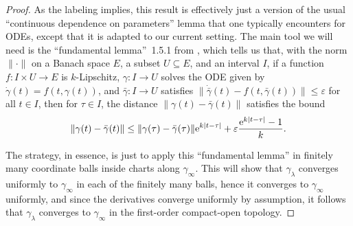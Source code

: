 \documentclass[pdftex]{sigma}
\numberwithin{equation}{section}
\theoremstyle{definition}
\begin{document}
\begin{proof}As the labeling implies, this result is effectively just a version of the usual ``continuous dependence on parameters'' lemma that one typically encounters for ODEs, except that it is adapted to our current setting. The main tool we will need is the ``fundamental lemma''~1.5.1 from \cite[Chapter~2]{HCartan1971}, which tells us that, with the norm $\|\cdot\|$ on a Banach space $E$, a subset $U\subseteq E$, and an interval $I$, if a function $f\colon I\times U\to E$ is $k$-Lipschitz, $\gamma \colon I\to U$ solves the ODE given by $\dot{\gamma}(t)=f(t,\gamma(t))$, and $\bar{\gamma}\colon I\to U$ satisfies $\|\dot{\bar{\gamma}}(t)-f(t,\bar{\gamma}(t))\|\leq\varepsilon$ for all $t\in I$, then for $\tau\in I$, the distance $\|\gamma(t)-\bar{\gamma}(t)\|$ satisfies the bound \[\|\gamma(t)-\bar{\gamma}(t)\|\leq\|\gamma(\tau)-\bar{\gamma}(\tau)\|{\rm e}^{k|t-\tau|}+\varepsilon\frac{{\rm e}^{k|t-\tau|}-1}{k}.\]

The strategy, in essence, is just to apply this ``fundamental lemma'' in finitely many coordinate balls inside charts along $\gamma_\infty$. This will show that $\gamma_\lambda$ converges uniformly to $\gamma_\infty$ in each of the finitely many balls, hence it converges to $\gamma_\infty$ uniformly, and since the derivatives converge uniformly by assumption, it follows that $\gamma_\lambda$ converges to $\gamma_\infty$ in the first-order compact-open topology.


\end{proof}
\end{document}
